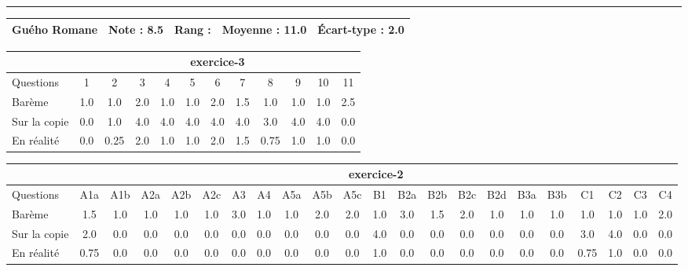 \documentclass[a4paper, landscape, 10pt]{article}
\begin{document}
\begin{minipage}{\textwidth}
  \end{minipage}
  \vspace{0.3cm}
  \hrule
  \vspace{0.3cm}

  \begin{minipage}{\textwidth}
    { \bf
    \begin{tabular}{|c|*{4}{c|}}
    \hline
      Guého Romane & Note : 8.5 & Rang :  & Moyenne : 11.0 & \'Ecart-type : 2.0 \\
    \hline
    \end{tabular}
    }
    
      \begin{tabular}{|l|*{ 11 }{c|}}
        \hline
        & \multicolumn{ 11 }{c|}{ exercice-3 } \\
        \hline
        Questions & 1&2&3&4&5&6&7&8&9&10&11 \\
        \hline
        Barème & 1.0&1.0&2.0&1.0&1.0&2.0&1.5&1.0&1.0&1.0&2.5 \\
        \hline
        Sur la copie & 0.0&1.0&4.0&4.0&4.0&4.0&4.0&3.0&4.0&4.0&0.0 \\
        \hline
        En réalité & 0.0&0.25&2.0&1.0&1.0&2.0&1.5&0.75&1.0&1.0&0.0 \\
        \hline
      \end{tabular}
    
      \begin{tabular}{|l|*{ 21 }{c|}}
        \hline
        & \multicolumn{ 21 }{c|}{ exercice-2 } \\
        \hline
        Questions & A1a&A1b&A2a&A2b&A2c&A3&A4&A5a&A5b&A5c&B1&B2a&B2b&B2c&B2d&B3a&B3b&C1&C2&C3&C4 \\
        \hline
        Barème & 1.5&1.0&1.0&1.0&1.0&3.0&1.0&1.0&2.0&2.0&1.0&3.0&1.5&2.0&1.0&1.0&1.0&1.0&1.0&1.0&2.0 \\
        \hline
        Sur la copie & 2.0&0.0&0.0&0.0&0.0&0.0&0.0&0.0&0.0&0.0&4.0&0.0&0.0&0.0&0.0&0.0&0.0&3.0&4.0&0.0&0.0 \\
        \hline
        En réalité & 0.75&0.0&0.0&0.0&0.0&0.0&0.0&0.0&0.0&0.0&1.0&0.0&0.0&0.0&0.0&0.0&0.0&0.75&1.0&0.0&0.0 \\
        \hline
      \end{tabular}
    

\end{minipage}
\end{document}
